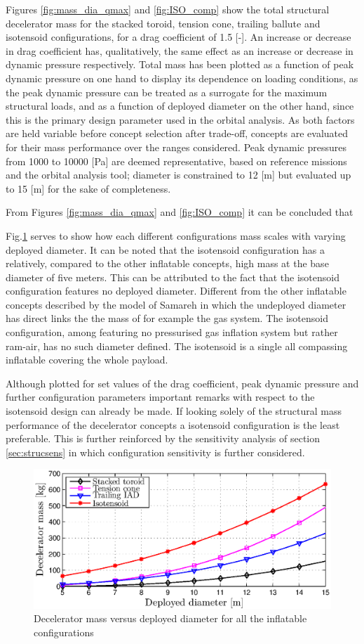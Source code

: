 Figures \ref{fig:mass_dia_qmax} and \ref{fig:ISO_comp} show the total structural decelerator mass for the stacked toroid, tension cone, trailing ballute and isotensoid configurations, for a drag coefficient of 1.5 [-]. An increase or decrease in drag coefficient has, qualitatively, the same effect as an increase or decrease in dynamic pressure respectively. Total mass has been plotted as a function of peak dynamic pressure on one hand to display its dependence on loading conditions, as the peak dynamic pressure can be treated as a surrogate for the maximum structural loads, and as a function of deployed diameter on the other hand, since this is the primary design parameter used in the orbital analysis. As both factors are held variable before concept selection after trade-off, concepts are evaluated for their mass performance over the ranges considered. Peak dynamic pressures from 1000 to 10000 [Pa] are deemed representative, based on reference missions and the orbital analysis tool; diameter is constrained to 12 [m] but evaluated up to 15 [m] for the sake of completeness. 

From Figures \ref{fig:mass_dia_qmax} and \ref{fig:ISO_comp} it can be concluded that

Fig.\ref{fig:mass_dia} serves to show how each different configurations mass scales with varying deployed diameter. It can be noted that the isotensoid configuration has a relatively, compared to the other inflatable concepts, high mass at the base diameter of five meters. This can be attributed to the fact that the isotensoid configuration features no deployed diameter. Different from the other inflatable concepts described by the model of Samareh in which the undeployed diameter has direct links the the mass of for example the gas system. The isotensoid configuration, among featuring no pressurised gas inflation system but rather ram-air, has no such diameter defined. The isotensoid is a single all compassing inflatable covering the whole payload. 

Although plotted for set values of the drag coefficient, peak dynamic pressure and further configuration parameters important remarks with respect to the isotensoid design can already be made. If looking solely of the structural mass performance of the decelerator concepts a isotensoid configuration is the least preferable. This is further reinforced by the sensitivity analysis of section \ref{sec:strucsens} in which configuration sensitivity is further considered. 

\begin{figure}[H]
\includegraphics[width = 1.0\textwidth]{Figure/mass_dia.eps}
\caption{Decelerator mass versus deployed diameter for all the inflatable configurations}
\label{fig:mass_dia}
\end{figure}
